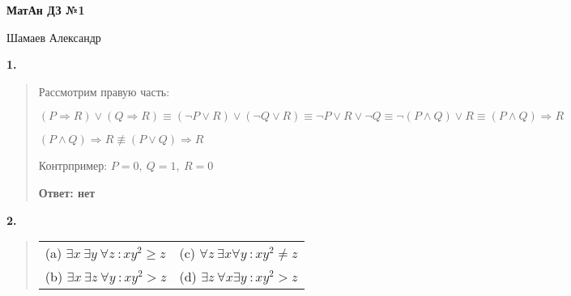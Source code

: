 \documentclass{article}
\begin{document}
\setlength{\parindent}{0pt}
\begin{Large}
    \textsf{\textbf{МатАн ДЗ №1}}
    
    Шамаев Александр    
\end{Large}
\vspace{1cm}

\textsf{\textbf{1.}}
\begin{quote}
\leftskip=0.2cm    
Рассмотрим правую часть: 

$
(P  \Rightarrow R) \lor (Q  \Rightarrow R)
\equiv (\neg P  \lor R) \lor (\neg Q \lor R)
\equiv \neg P \lor R \lor \neg Q
\equiv \neg (P \land Q) \lor R
\equiv (P \land Q) \Rightarrow R
$

$(P \land Q) \Rightarrow R \not\equiv (P \lor Q) \Rightarrow R$

Контрпример: $P = 0, \ Q = 1, \ R = 0$

\textbf{Ответ: нет}
\end{quote}

\textsf{\textbf{2.}}
\begin{quote}

\begin{tabular*}{\columnwidth}{l l}
(a) $\exists x \ \exists y \ \forall z \ : xy^2 \ge z$& (c) $\forall z \ \exists x \forall y \ : xy^2 \neq z$ \\
(b) $\exists x \ \exists z \ \forall y \ : xy^2 > z$& (d) $\exists z \ \forall x \exists y \ : xy^2 > z $\\
\end{tabular*}
\end{quote}
\end{document}
